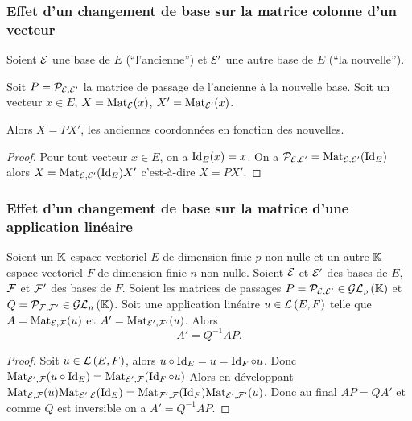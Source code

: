 \subsubsection{Effet d'un changement de base sur la matrice colonne d'un 
vecteur}

\begin{theo}
  Soient \(\mathcal{E}\) une base de \(E\) (``l'ancienne'') et \(\mathcal{E}'\) une autre base 
  de \(E\) (``la nouvelle''). 

  Soit \(P=\mathcal{P}_{\mathcal{E},\mathcal{E}'}\) la matrice de passage de l'ancienne à la nouvelle 
  base. Soit un vecteur \(x \in E\), \(X=\mathrm{Mat}_{\mathcal{E}}(x)\), \(X'=\mathrm{Mat}_{\mathcal{E}'}(x)\). 

  Alors \(X=PX'\), \danger les anciennes coordonnées en fonction des 
  nouvelles.
\end{theo}
\begin{proof}
  Pour tout vecteur \(x \in E\), on a \(\operatorname{Id}_E(x)=x\). On a \(\mathcal{P}_{\mathcal{E},\mathcal{E}'} = 
  \mathrm{Mat}_{\mathcal{E},\mathcal{E}'}(\operatorname{Id}_E)\) alors \(X = \mathrm{Mat}_{\mathcal{E},\mathcal{E}'}(\operatorname{Id}_E) X'\) c'est-à-dire 
  \(X=PX'\).
\end{proof}

\subsubsection{Effet d'un changement de base sur la matrice d'une 
application linéaire}

\begin{theo}
  Soient un \(\mathbb{K}\)-espace vectoriel \(E\) de dimension finie \(p\) non nulle 
  et un autre \(\mathbb{K}\)-espace vectoriel \(F\) de dimension finie \(n\) non 
  nulle. Soient \(\mathcal{E}\) et \(\mathcal{E}'\) des bases de \(E\), \(\mathcal{F}\) et \(\mathcal{F}'\) des 
  bases de \(F\). Soient les matrices de passages \(P=\mathcal{P}_{\mathcal{E},\mathcal{E}'} \in 
  \mathcal{GL}_{p}\left(\mathbb{K}\right)\) et \(Q=\mathcal{P}_{\mathcal{F},\mathcal{F}'} \in \mathcal{GL}_{n}\left(\mathbb{K}\right)\). Soit une application 
  linéaire \(u \in \mathcal{L}\left(E,F\right)\) telle que \(A=\mathrm{Mat}_{\mathcal{E},\mathcal{F}}(u)\) et 
  \(A'=\mathrm{Mat}_{\mathcal{E}',\mathcal{F}'}(u)\). Alors
  \begin{equation}
    A'=Q^{-1}AP.
  \end{equation}
\end{theo}
\begin{proof}
  Soit  \(u \in \mathcal{L}\left(E,F\right)\), alors \(u \circ \operatorname{Id}_E = u = \operatorname{Id}_F \circ u\). 
  Donc \(\mathrm{Mat}_{\mathcal{E}',\mathcal{F}}(u \circ \operatorname{Id}_E) = \mathrm{Mat}_{\mathcal{E}',\mathcal{F}}(\operatorname{Id}_F \circ u)\) Alors 
  en développant \(\mathrm{Mat}_{\mathcal{E},\mathcal{F}}(u) \mathrm{Mat}_{\mathcal{E}',\mathcal{E}}(\operatorname{Id}_E) 
  =\mathrm{Mat}_{\mathcal{F}',\mathcal{F}}(\operatorname{Id}_F) \mathrm{Mat}_{\mathcal{E}',\mathcal{F}'}(u) \). Donc au final \(AP=QA'\) et 
  comme \(Q\) est inversible on a \(A'=Q^{-1}AP\).
\end{proof}

